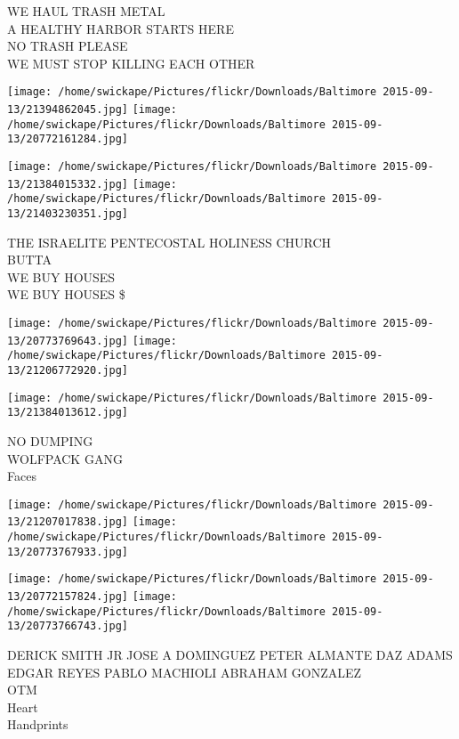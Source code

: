 \documentclass[10pt,letterpaper]{article}
\begin{document}
WE HAUL TRASH METAL\\
A HEALTHY HARBOR STARTS HERE\\
NO TRASH PLEASE\\
WE MUST STOP KILLING EACH OTHER\\
\pagebreak

\texttt{[image: /home/swickape/Pictures/flickr/Downloads/Baltimore 2015-09-13/21394862045.jpg]}
\texttt{[image: /home/swickape/Pictures/flickr/Downloads/Baltimore 2015-09-13/20772161284.jpg]}

\texttt{[image: /home/swickape/Pictures/flickr/Downloads/Baltimore 2015-09-13/21384015332.jpg]}
\texttt{[image: /home/swickape/Pictures/flickr/Downloads/Baltimore 2015-09-13/21403230351.jpg]}

THE ISRAELITE PENTECOSTAL HOLINESS CHURCH\\
BUTTA\\
WE BUY HOUSES\\
WE BUY HOUSES \$\\
\pagebreak

\texttt{[image: /home/swickape/Pictures/flickr/Downloads/Baltimore 2015-09-13/20773769643.jpg]}
\texttt{[image: /home/swickape/Pictures/flickr/Downloads/Baltimore 2015-09-13/21206772920.jpg]}

\vspace{0.25in}
\texttt{[image: /home/swickape/Pictures/flickr/Downloads/Baltimore 2015-09-13/21384013612.jpg]}

NO DUMPING\\
WOLFPACK GANG\\
Faces\\
\pagebreak

\texttt{[image: /home/swickape/Pictures/flickr/Downloads/Baltimore 2015-09-13/21207017838.jpg]}
\texttt{[image: /home/swickape/Pictures/flickr/Downloads/Baltimore 2015-09-13/20773767933.jpg]}

\texttt{[image: /home/swickape/Pictures/flickr/Downloads/Baltimore 2015-09-13/20772157824.jpg]}
\texttt{[image: /home/swickape/Pictures/flickr/Downloads/Baltimore 2015-09-13/20773766743.jpg]}

DERICK SMITH JR JOSE A DOMINGUEZ PETER ALMANTE DAZ ADAMS EDGAR REYES PABLO MACHIOLI ABRAHAM GONZALEZ\\
OTM\\
Heart\\
Handprints\\
\pagebreak
\end{document}
